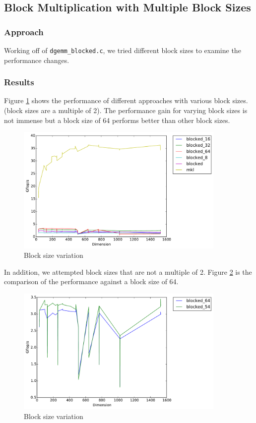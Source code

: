 \documentclass[11pt]{article}
\begin{document}
\subsection{Block Multiplication with Multiple Block Sizes}
\subsubsection{Approach}
Working off of \texttt{dgemm\_blocked.c}, we tried different block sizes to examine the performance changes. 
\subsubsection{Results}
Figure \ref{pow_2_blocks} shows the performance of different approaches with various block sizes. (block sizes are a multiple of 2). The performance gain for varying block sizes is not immense but a block size of 64 performs better than other block sizes. \\

\begin{figure}[H]
    \includegraphics[width=0.9\textwidth]{timing_block_size_changes.pdf}
    \caption{Block size variation}
    \label{pow_2_blocks}
\end{figure} 

In addition, we attempted block sizes that are not a multiple of 2. Figure \ref{odd_blocks} is the comparison of the performance against a block size of 64.\\
\begin{figure}[H]
    \includegraphics[width=0.9\textwidth]{timing_54_64.pdf}
    \caption{Block size variation}
    \label{odd_blocks}
\end{figure} 
\end{document}
